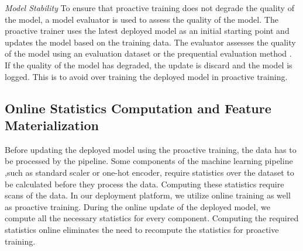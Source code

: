 \textit{Model Stability}
To ensure that proactive training does not degrade the quality of the model, a model evaluator is used to assess the quality of the model.
The proactive trainer uses the latest deployed model as an initial starting point and updates the model based on the training data.
The evaluator assesses the quality of the model using an evaluation dataset or the prequential evaluation method \cite{dawid1984present}.
If the quality of the model has degraded, the update is discard and the model is logged.
This is to avoid over training the deployed model in proactive training.


\subsection{Online Statistics Computation and Feature Materialization}
Before updating the deployed model using the proactive training, the data has to be processed by the pipeline.
Some components of the machine learning pipeline ,such as standard scaler or one-hot encoder, require statistics over the dataset to be calculated before they process the data.
Computing these statistics require scans of the data.
In our deployment platform, we utilize online training as well as proactive training.
During the online update of the deployed model, we compute all the necessary statistics for every component.
Computing the required statistics online eliminates the need to recompute the statistics for proactive training.

